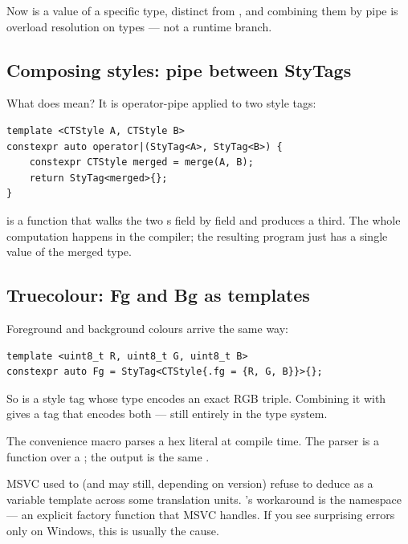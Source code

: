 Now  is a value of a specific type, distinct from
, and combining them by pipe is overload resolution
on types --- not a runtime branch.

\subsection*{Composing styles: pipe between StyTags}

What does  mean? It is operator-pipe applied
to two style tags:

\begin{lstlisting}
template <CTStyle A, CTStyle B>
constexpr auto operator|(StyTag<A>, StyTag<B>) {
    constexpr CTStyle merged = merge(A, B);
    return StyTag<merged>{};
}
\end{lstlisting}

 is a  function that walks the two
s field by field and produces a third. The whole
computation happens in the compiler; the resulting program just
has a single  value of the merged type.

\subsection*{Truecolour: Fg and Bg as templates}

Foreground and background colours arrive the same way:

\begin{lstlisting}
template <uint8_t R, uint8_t G, uint8_t B>
constexpr auto Fg = StyTag<CTStyle{.fg = {R, G, B}}>{};
\end{lstlisting}

So  is a style tag whose type encodes
an exact RGB triple. Combining it with  gives a tag
that encodes both --- still entirely in the type system.

The convenience macro  parses a hex literal
at compile time. The parser is a  function over
a ; the output is the same .

\begin{warning}
MSVC used to (and may still, depending on version) refuse to
deduce  as a variable template across some translation
units. \maya{}'s workaround is the  namespace
--- an explicit factory function that MSVC handles. If you see
surprising errors only on Windows, this is usually the cause.
\end{warning}


